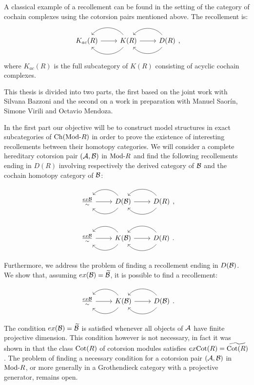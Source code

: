 A classical example of a recollement can be found in the setting of the category of cochain complexes using the cotorsion pairs mentioned above. The recollement is:
\begin{equation*}
\recdiagram{K_{ac}(R)}{K(R)}{D(R)},
\end{equation*}
where $K_{ac}(R)$ is the full subcategory of $K(R)$ consisting of acyclic cochain complexes.

This thesis is divided into two parts, the first based on the joint work \cite{bazzoni2018recollements} with Silvana Bazzoni and the second on a work in preparation with Manuel Saor\'in, Simone Virili and Octavio Mendoza.

\smallskip

In the first part our objective will be to construct model structures in exact subcategories of $\mathrm{Ch}(\mathrm{Mod}\textrm{-}R)$ in order to prove the existence of interesting recollements between their homotopy categories. We will consider a complete hereditary cotorsion pair $(\mathcal{A},\mathcal{B})$ in $\mathrm{Mod}\textrm{-}R$ and find the following recollements ending in $D(R)$ involving respectively the derived category of $\mathcal{B}$ and the cochain homotopy category of $\mathcal{B}$:

\begin{equation*}
  \recdiagram{\frac{ex \B}{\sim}}{D(\B)}{D(R)},
\end{equation*}

\begin{equation*}
  \recdiagram{\frac{ex \B}{\sim}}{K(\B)}{D(R)}.
\end{equation*}

Furthermore, we address the problem of finding a recollement ending in $D(\mathcal{B})$. We show that, assuming $ex(\mathcal{B})=\widetilde{\mathcal{B}}$, it is possible to find a recollement:

\begin{equation*}
  \recdiagram{\frac{ex \B}{\sim}}{K(\B)}{D(\B)}.
\end{equation*}

The condition $ex(\mathcal{B})=\widetilde{\mathcal{B}}$ is satisfied whenever all objects of $\mathcal{A}$ have finite projective dimension. This condition however is not necessary, in fact it was shown in \cite{BCIE} that the class $\mathrm{Cot}(R)$ of cotorsion modules satisfies $ex\mathrm{Cot}(R)=\widetilde{\mathrm{Cot}(R)}$. The problem of finding a necessary condition for a cotorsion pair $(\mathcal{A},\mathcal{B})$ in $\mathrm{Mod}\textrm{-}R$, or more generally in a Grothendieck category with a projective generator, remains open.

